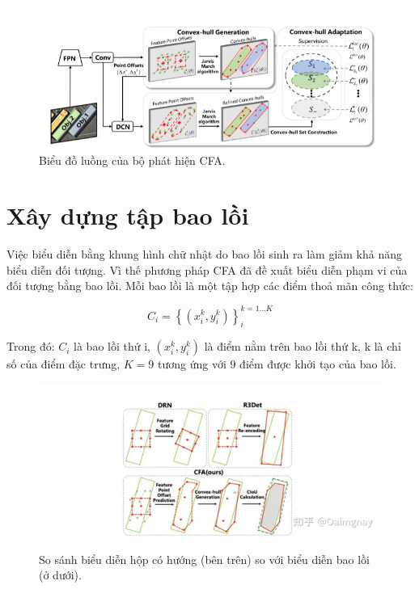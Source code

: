 \documentclass[12pt,a4paper,openany,oneside]{report}
\begin{document}
\begin{figure}[ht!]
	\begin{center}
		\includegraphics[width=450px]{./work_flow_cfa.JPG}
		\caption{Biểu đồ luồng của bộ phát hiện CFA.}
		\label{work_flow_cfa}
	\end{center}
\end{figure} 

\section{Xây dựng tập bao lồi}
Việc biểu diễn bằng khung hình chữ nhật do bao lồi sinh ra làm giảm khả năng biểu diễn đối tượng. Vì thế phương pháp CFA đã đề xuất biểu diễn phạm vi của đối tượng bằng bao lồi. Mỗi bao lồi là một tập hợp các điểm thoả mãn công thức:

\begin{center}
	\begin{equation*}
		C_i=\left\{\left(x_i^k, y_i^k\right)\right\}_i^{k=1 \ldots K}
		\label{ct1}
	\end{equation*}


\end{center}
Trong đó: $C_i$ là bao lồi thứ i, $\left(x_i^k, y_i^k\right)$ là điểm nằm trên bao lồi thứ k, k là chỉ số của điểm đặc trưng, $K = 9$ tương ứng với 9 điểm được khởi tạo của bao lồi.

\begin{figure}[ht!]
	\begin{center}
		\includegraphics[width=445px]{./compare_convex-hull_with_rectangle.jpg}
		\caption{So sánh biểu diễn hộp có hướng (bên trên) so với biểu diễn bao lồi (ở dưới).}
		\label{fig_dhandang1}
	\end{center}
\end{figure} 
\end{document}
